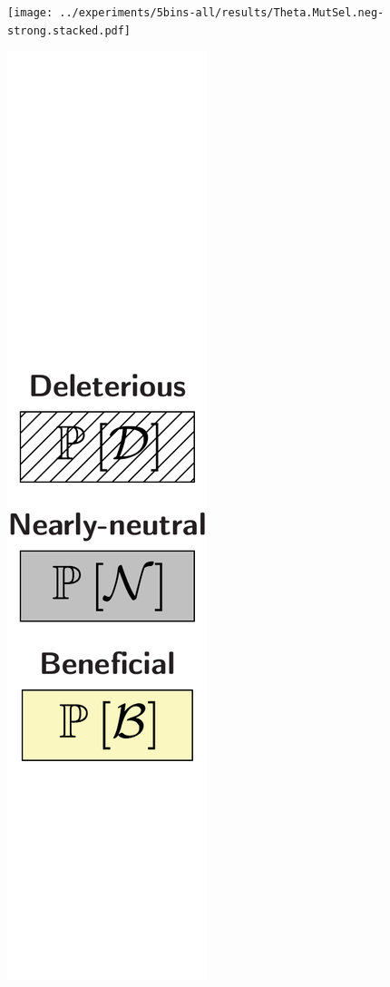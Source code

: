 \documentclass{article}
\begin{document}
\begin{center}
\begin{minipage}{0.09\linewidth}
        \end{minipage}
        \begin{minipage}{0.9\linewidth}
            \texttt{[image: ../experiments/5bins-all/results/Theta.MutSel.neg-strong.stacked.pdf]} \\
        \end{minipage}
        \begin{minipage}{0.09\linewidth}
            \includegraphics[width=\linewidth, page=1]{artworks/legend.polycat}

\end{minipage}
\end{center}
\end{document}
